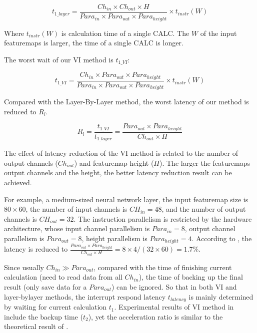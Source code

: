 \begin{equation*}
	t_{1\_layer} = \frac{ Ch_{in} \times Ch_{out} \times H }{ Para_{in} \times Para_{out} \times Para_{height} } \times t_{instr}(W)
\end{equation*}

Where $t_{instr}(W)$ is calculation time of a single CALC. The $W$ of the input featuremaps is larger, the time of a single CALC is longer.

The worst wait of our VI method is $t_{1\_VI}$:

\begin{equation*}
	t_{1\_VI} = \frac{ Ch_{in} \times Para_{out} \times Para_{height} }{ Para_{in} \times Para_{out} \times Para_{height} } \times t_{instr}(W)
\end{equation*}

Compared with the Layer-By-Layer method, the worst latency of our method is reduced to $R_l$.

\begin{equation}
	R_l = \frac{ t_{1\_VI} }{ t_{1\_layer} } = \frac{ Para_{out} \times Para_{height} }{ Ch_{out} \times H} 
	\label{equ:rate}
\end{equation}

The effect of latency reduction of the VI method is related to the number of output channels ($Ch_{out}$) and featuremap height ($H$). The larger the featuremaps output channels and the height, the better latency reduction result can be achieved.

For example, a medium-sized neural network layer, the input featuremap size is $80 \times 60$, the number of input channels is $CH_{in} = 48$, and the number of output channels is $CH_{out} = 32$. The instruction parallelism is restricted by the hardware architecture, whose input channel parallelism is $Para_{in} = 8$, output channel parallelism is $Para_{out} = 8$, height parallelism is $Para_{height} = 4$.
According to , the latency is reduced to $\frac{ Para_{out} \times Para_{height} }{ Ch_{out} \times H} = 8 \times 4 / (32 \times 60) = 1.7\%$.

Since usually $Ch_{in} \gg Para_{out}$, compared with the time of finishing current calculation (need to read data from all $Ch_{in}$), the time of backing up the final result (only save data for a $Para_{out}$) can be ignored. So that in both VI and layer-bylayer methods, the interrupt respond latency $t_{latency}$ is mainly determined by waiting for current calculation $t_{1}$. Experimental results of VI method in  include the backup time ($t_2$), yet the acceleration ratio is similar to the theoretical result of .

